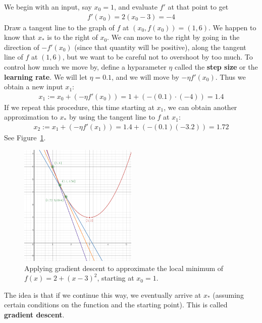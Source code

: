 \documentclass[12pt, a4paper]{article}
\theoremstyle{definition}
\begin{document}
	We begin with an input, say $x_0 = 1$, and evaluate $f'$ at that point to get
	\begin{align*}
		f'(x_0) = 2(x_0 - 3) = -4
	\end{align*}
	Draw a tangent line to the graph of $f$ at $(x_0, f(x_0)) = (1, 6)$.
	We happen to know that $x_*$ is to the right of $x_0$. We can move to the right
	by going in the direction of $-f'(x_0)$ (since that quantity will be positive),
	along the tangent line of $f$ at $(1, 6)$, but we want to be careful not to overshoot
	by too much. To control how much we move by, define a hyparameter $\eta$ called
	the \textbf{step size} or the \textbf{learning rate}. We will let $\eta = 0.1$, and
	we will move by $-\eta f'(x_0)$. Thus we obtain a new input $x_1$:
	\begin{align*}
		x_1 := x_0 + (-\eta f'(x_0)) = 1 + (-(0.1)\cdot (-4)) = 1.4
	\end{align*}
	If we repeat this procedure, this time starting at $x_1$, we can obtain
	another approximation to $x_*$ by using the tangent line to $f$ at $x_1$:
	\begin{align*}
		x_2 := x_1 + (-\eta f'(x_1)) = 1.4 + (-(0.1)(-3.2)) = 1.72
	\end{align*}
	See Figure~\ref{fig:gradient-descent-2d}.
	\begin{figure}
		\centering
		\includegraphics[width=0.5\textwidth]{gradient-descent-2d}
		\caption{Applying gradient descent to approximate the local minimum
		of $f(x) = 2 + (x - 3)^2$, starting at $x_0 = 1$.}
		\label{fig:gradient-descent-2d}
	\end{figure}
	The idea is that if we continue this way, we eventually arrive at $x_*$
	(assuming certain conditions on the function and the starting point).
	This is called \textbf{gradient descent}.
\end{document}

